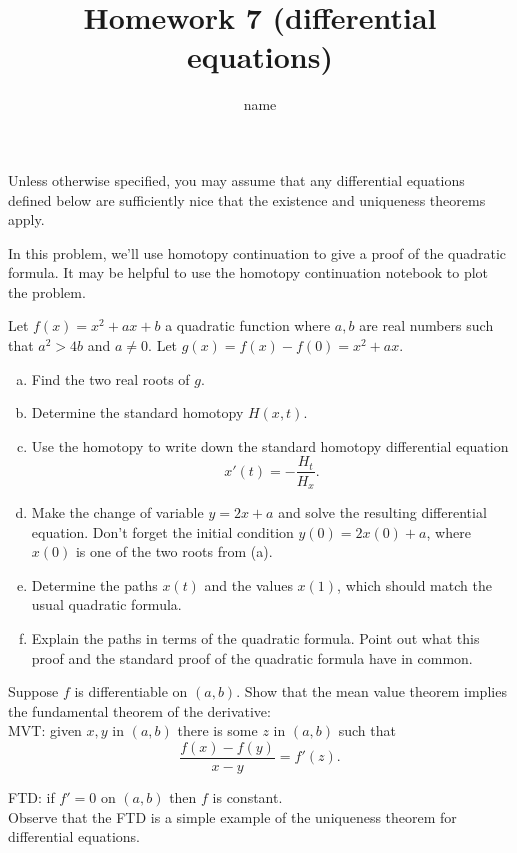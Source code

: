 \documentclass{article}
\title{\vspace{-4em}Homework 7 (differential equations)}
\author{name}
\begin{document}
\maketitle

Unless otherwise specified, you may assume that any differential equations defined below are sufficiently nice that the existence and uniqueness theorems apply.



\begin{problem}
    In this problem, we'll use homotopy continuation to give a proof of the quadratic formula. It may be helpful to use the homotopy continuation notebook to plot the problem.

    \hspace{2em} Let \(f(x) = x^2 + ax + b\) a quadratic function where \(a,b\) are real numbers such that \(a^2>4b\) and \(a\neq 0\). Let \(g(x) = f(x) -f(0) = x^2 + ax\).
    \begin{enumerate}[a)]
        \item Find the two real roots of \(g\).
        \item Determine the standard homotopy \(H(x,t)\).
        \item Use the homotopy to write down the standard homotopy differential equation
        \[x'(t) = - \frac{H_t}{H_x}.\]
        \item Make the change of variable \(y=2x+a\) and solve the resulting differential equation.
        Don't forget the initial condition \(y(0)=2x(0) + a\), where \(x(0)\) is one of the two roots from (a).
        \item Determine the paths \(x(t)\) and the values \(x(1)\), which should match the usual quadratic formula.
        \item Explain the paths in terms of the quadratic formula. Point out what this proof and the standard proof of the quadratic formula have in common.
    \end{enumerate}
\end{problem}



\begin{problem}
    Suppose \(f\) is differentiable on \((a,b)\). Show that the mean value theorem implies the fundamental theorem of the derivative:\\
    
    MVT: given \(x,y\) in \((a,b)\) there is some \(z\) in \((a,b)\) such that
    \[\frac{f(x) - f(y)}{x-y} = f'(z).\]

    FTD: if \(f' = 0\) on \((a,b)\) then \(f\) is constant.\\

    Observe that the FTD is a simple example of the uniqueness theorem for differential equations.
\end{problem}
\end{document}
